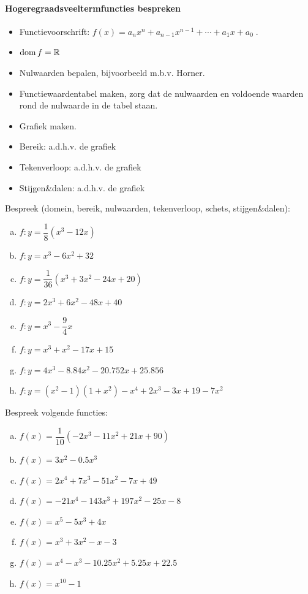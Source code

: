 \documentclass[12pt,twoside,a4paper]{article}
\begin{document}
\paragraph*{Hogeregraadsveeltermfuncties bespreken}
\begin{mdframed}
  \begin{itemize}
  \item Functievoorschrift: $f(x)= a_nx^n + a_{n-1}x^{n-1} + \cdots + a_1x + a_0\;.$
  \item $\dom f = \mathbb{R}$
  \item Nulwaarden bepalen, bijvoorbeeld m.b.v. Horner.
  \item Functiewaardentabel maken, zorg dat de nulwaarden en voldoende waarden rond de nulwaarde in de tabel staan.
  \item Grafiek maken.
  \item Bereik: a.d.h.v. de grafiek
  \item Tekenverloop: a.d.h.v. de grafiek
  \item Stijgen\&dalen: a.d.h.v. de grafiek
  \end{itemize}
\end{mdframed}

\begin{oefening}
Bespreek (domein, bereik, nulwaarden, tekenverloop, schets, stijgen\&dalen):
\begin{multicols}{2}
\begin{enumerate}[(a)]
  \itemsep.8em
  \item $f:y=\dfrac{1}{8}(x^3-12x)$
  \item $f:y=x^3-6x^2+32$
  \item $f:y=\dfrac{1}{36}(x^3+3x^2-24x+20)$
  \item $f:y=2x^3+6x^2-48x+40$
  \item $f:y=x^3-\dfrac{9}{4}x$
  \item $f:y=x^3+x^2-17x+15$
  \item $f:y=4x^3-8.84x^2-20.752x+25.856$
  \item $f:y=(x^2-1)(1+x^2)-x^4+2x^3-3x+19-7x^2$
\end{enumerate}
\end{multicols}
\end{oefening}

\begin{oefening}
  Bespreek volgende functies:
  \begin{multicols}{2}
    \begin{enumerate}[(a)]
      \itemsep.8em
    \item $f(x)=\dfrac{1}{10}(-2x^3-11x^2+21x+90)$
    \item $f(x)=3x^2-0.5x^3$
    \item $f(x)=2x^4+7x^3-51x^2-7x+49$
    \item $f(x)=-21x^4-143x^3+197x^2-25x-8$
    \item $f(x)=x^5-5x^3+4x$
    \item $f(x)=x^3+3x^2-x-3$
    \item $f(x)=x^4-x^3-10.25x^2+5.25x+22.5$
    \item $f(x)=x^{10}-1$
    \end{enumerate}
  \end{multicols}
\end{oefening}
\end{document}
